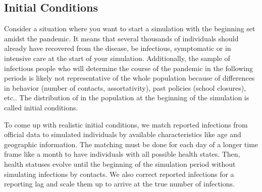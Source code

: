 \subsection{Initial Conditions} %
\label{sub:initial_conditions}

Consider a situation where you want to start a simulation with the beginning set amidst
the pandemic. It means that several thousands of individuals should already have
recovered from the disease, be infectious, symptomatic or in intensive care at the start
of your simulation. Additionally, the sample of infectious people who will determine the
course of the pandemic in the following periods is likely not representative of the whole
population because of differences in behavior (number of contacts, assortativity), past
policies (school closures), etc.. The distribution of  in the population at the beginning of the simulation is
called initial conditions.

To come up with realistic initial conditions, we match reported infections from official
data to simulated individuals by available characteristics like age and geographic
information. The matching must be done for each day of a longer time frame like a month
to have individuals with all possible health states. Then, health statuses evolve until
the beginning of the simulation period without simulating infections by contacts. We also
correct reported infections for a reporting lag and scale them up  to arrive at the true number of infections.

